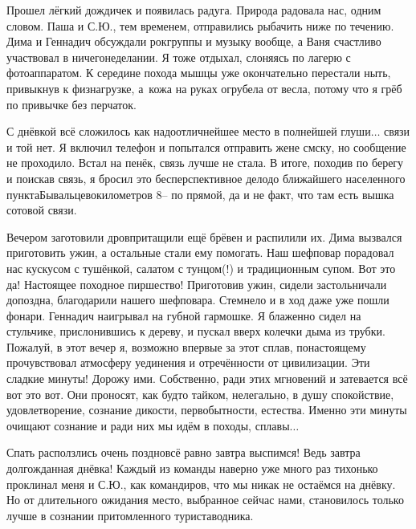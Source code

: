 Прошел лёгкий дождичек и появилась радуга. Природа радовала нас, одним словом. Паша и С.Ю., тем временем, отправились рыбачить ниже по течению. Дима и Геннадич обсуждали рок\sdash группы и музыку вообще, а Ваня счастливо участвовал в ничегонеделании. Я тоже отдыхал, слоняясь по лагерю с фотоаппаратом. К середине похода мышцы уже окончательно перестали ныть, привыкнув к физнагрузке, а~кожа на руках огрубела от весла, потому что я грёб по привычке без перчаток. 

С днёвкой всё сложилось как надо\mdash отличнейшее место в полнейшей глуши$\ldots$ связи и той нет. Я включил телефон и попытался отправить жене смску, но сообщение не проходило. Встал на пенёк, связь лучше не стала. В итоге, походив по берегу и поискав связь, я бросил это бесперспективное дело\mdash до ближайшего населенного пункта\mdash Бывальцево\mdash  километров 8\thinspace\nobreakdash-- по прямой, да и не факт, что там есть вышка сотовой связи.

Вечером заготовили дров\mdash притащили ещё брёвен и распилили их. Дима вызвался приготовить ужин, а остальные стали ему помогать. Наш шеф\sdash повар порадовал нас кус\sdash кусом с тушёнкой, салатом с тунцом(!) и традиционным супом. Вот это да! Настоящее походное пиршество! Приготовив ужин, сидели застольничали допоздна, благодарили нашего шеф\sdash повара. Стемнело и в ход даже уже пошли фонари. Геннадич наигрывал на губной гармошке. Я блаженно сидел на стульчике, прислонившись к дереву, и пускал вверх колечки дыма из трубки. Пожалуй, в этот вечер я, возможно впервые за этот сплав, по\sdash настоящему прочувствовал атмосферу уединения и отречённости от цивилизации. Эти сладкие минуты! Дорожу ими. Собственно, ради этих мгновений и затевается всё вот это вот. Они проносят, как будто тайком, нелегально, в душу спокойствие, удовлетворение, сознание дикости, первобытности, естества. Именно эти минуты очищают сознание и ради них мы идём в походы, сплавы$\ldots$ 

Спать расползлись очень поздно\mdash всё равно завтра выспимся! Ведь завтра долгожданная днёвка! Каждый из команды наверно уже много раз тихонько проклинал меня и С.Ю., как командиров, что мы никак не остаёмся на днёвку. Но от длительного ожидания место, выбранное сейчас нами, становилось только лучше в сознании притомленного туриста\sdash водника.

\begin{center}
\end{center}
